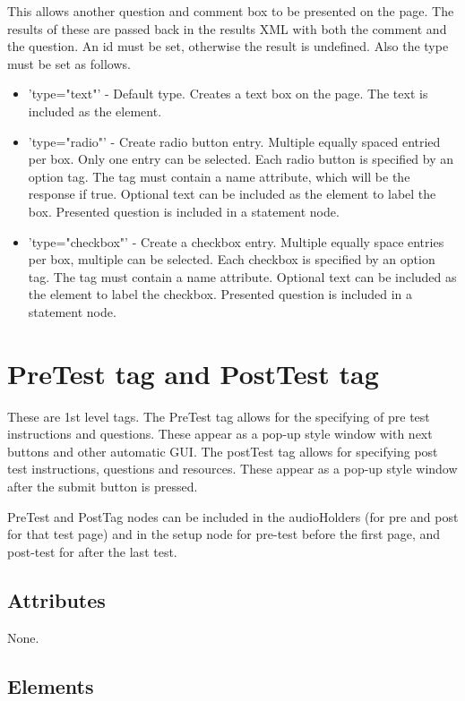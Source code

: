 \documentclass{article}
\begin{document}
This allows another question and comment box to be presented on the page. The results of these are passed back in the results XML with both the comment and the question. An id must be set, otherwise the result is undefined. Also the type must be set as follows.
\begin{itemize}
\item 'type="text"' - Default type. Creates a text box on the page. The text is included as the element.
\item 'type="radio"' - Create radio button entry. Multiple equally spaced entried per box. Only one entry can be selected. Each radio button is specified by an option tag. The tag must contain a name attribute, which will be the response if true. Optional text can be included as the element to label the box. Presented question is included in a statement node.
\item 'type="checkbox"' - Create a checkbox entry. Multiple equally space entries per box, multiple can be selected. Each checkbox is specified by an option tag. The tag must contain a name attribute. Optional text can be included as the element to label the checkbox. Presented question is included in a statement node.
\end{itemize}


\section {PreTest tag and PostTest tag}

These are 1st level tags. The PreTest tag allows for the specifying of pre test instructions and questions. These appear as a pop-up style window with next buttons and other automatic GUI. The postTest tag allows for specifying post test instructions, questions and resources. These appear as a pop-up style window after the submit button is pressed.

PreTest and PostTag nodes can be included in the audioHolders (for pre and post for that test page) and in the setup node for pre-test before the first page, and post-test for after the last test.

\subsection{Attributes}
None.

\subsection{Elements}
\end{document}
